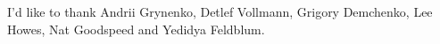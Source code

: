 
I'd like to thank Andrii Grynenko, Detlef Vollmann, Grigory Demchenko,
Lee Howes, Nat Goodspeed and Yedidya Feldblum.
